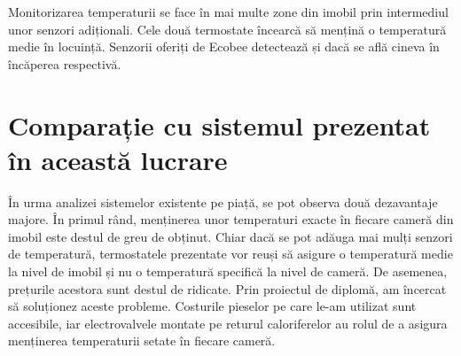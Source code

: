 	Monitorizarea temperaturii se face în mai multe zone din imobil prin intermediul unor senzori adiționali. Cele două termostate încearcă să mențină o temperatură medie în locuință. Senzorii oferiți de Ecobee detectează și dacă se află cineva în încăperea respectivă. 

\section{Comparație cu sistemul prezentat în această lucrare}

	În urma analizei sistemelor existente pe piață, se pot observa două dezavantaje majore. În primul rând, menținerea unor temperaturi exacte în fiecare cameră din imobil este destul de greu de obținut. Chiar dacă se pot adăuga mai mulți senzori de temperatură, termostatele prezentate vor reuși să asigure o temperatură medie la nivel de imobil și nu o temperatură specifică la nivel de cameră. De asemenea, prețurile acestora sunt destul de ridicate. Prin proiectul de diplomă, am încercat să soluționez aceste probleme. Costurile pieselor pe care le-am utilizat sunt accesibile, iar electrovalvele montate pe returul caloriferelor au rolul de a asigura menținerea temperaturii setate în fiecare cameră.
